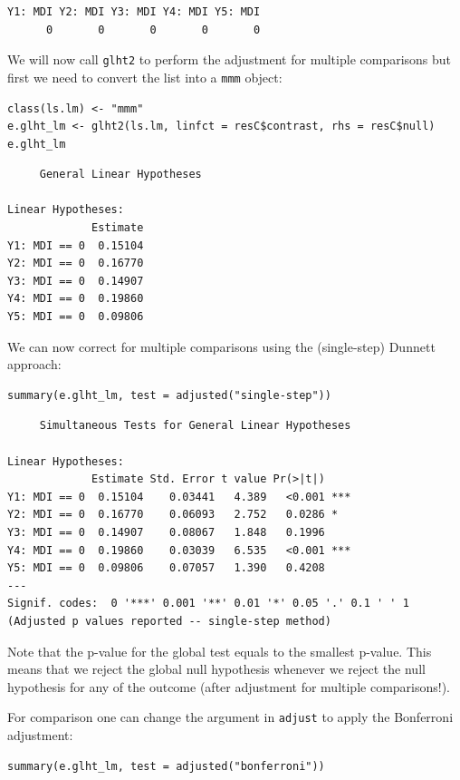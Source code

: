 \documentclass{article}
\begin{document}
\begin{verbatim}
Y1: MDI Y2: MDI Y3: MDI Y4: MDI Y5: MDI 
      0       0       0       0       0
\end{verbatim}

\clearpage

We will now call \texttt{glht2} to perform the adjustment for multiple
comparisons but first we need to convert the list into a \texttt{mmm} object:
\lstset{language=r,label= ,caption= ,captionpos=b,numbers=none}
\begin{lstlisting}
class(ls.lm) <- "mmm"
e.glht_lm <- glht2(ls.lm, linfct = resC$contrast, rhs = resC$null)
e.glht_lm
\end{lstlisting}

\begin{verbatim}
	 General Linear Hypotheses

Linear Hypotheses:
             Estimate
Y1: MDI == 0  0.15104
Y2: MDI == 0  0.16770
Y3: MDI == 0  0.14907
Y4: MDI == 0  0.19860
Y5: MDI == 0  0.09806
\end{verbatim}

We can now correct for multiple comparisons using the (single-step)
Dunnett approach:
\lstset{language=r,label= ,caption= ,captionpos=b,numbers=none}
\begin{lstlisting}
summary(e.glht_lm, test = adjusted("single-step"))
\end{lstlisting}

\begin{verbatim}
	 Simultaneous Tests for General Linear Hypotheses

Linear Hypotheses:
             Estimate Std. Error t value Pr(>|t|)    
Y1: MDI == 0  0.15104    0.03441   4.389   <0.001 ***
Y2: MDI == 0  0.16770    0.06093   2.752   0.0286 *  
Y3: MDI == 0  0.14907    0.08067   1.848   0.1996    
Y4: MDI == 0  0.19860    0.03039   6.535   <0.001 ***
Y5: MDI == 0  0.09806    0.07057   1.390   0.4208    
---
Signif. codes:  0 '***' 0.001 '**' 0.01 '*' 0.05 '.' 0.1 ' ' 1
(Adjusted p values reported -- single-step method)
\end{verbatim}

Note that the p-value for the global test equals to the smallest
 p-value. This means that we reject the global null hypothesis
 whenever we reject the null hypothesis for any of the outcome (after
 adjustment for multiple comparisons!).


For comparison one can change the argument in \texttt{adjust} to apply the
Bonferroni adjustment:
\lstset{language=r,label= ,caption= ,captionpos=b,numbers=none}
\begin{lstlisting}
summary(e.glht_lm, test = adjusted("bonferroni"))
\end{lstlisting}
\end{document}
